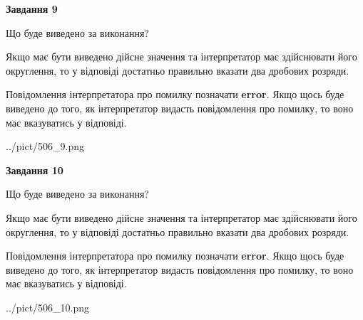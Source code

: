 \documentclass[12pt, ukrainian]{article}
\begin{document}
{\begin {Large}
{\begin {center}\textbf{Завдання 9}\end {center}}\par
Що буде виведено за виконання? \par

Якщо має бути виведено дійсне значення та інтерпретатор має здійснювати його округлення, 
то у відповіді достатньо правильно вказати два дробових розряди.

Повідомлення інтерпретатора про помилку позначати \textbf{error}.
Якщо щось буде виведено до того, як інтерпретатор видасть повідомлення про помилку, 
то воно має вказуватись у відповіді. \par

\begin{center}
	{../pict/506_9.png}
\end{center}
\newpage

{\begin {center}\textbf{Завдання 10}\end {center}}\par
Що буде виведено за виконання? \par

Якщо має бути виведено дійсне значення та інтерпретатор має здійснювати його округлення, 
то у відповіді достатньо правильно вказати два дробових розряди.

Повідомлення інтерпретатора про помилку позначати \textbf{error}.
Якщо щось буде виведено до того, як інтерпретатор видасть повідомлення про помилку, 
то воно має вказуватись у відповіді. \par

\begin{center}
	{../pict/506_10.png}
\end{center}
\newpage

\end {Large}}
\end{document}
